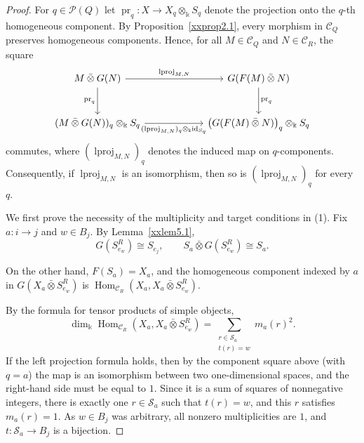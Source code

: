 \documentclass{amsart}
\newcommand{\id}{\mathrm{id}}
\DeclareMathOperator{\lproj}{lproj}
\newcommand{\btensor}{\mathbin{\bar{\otimes}}}
\theoremstyle{definition}
\theoremstyle{remark}
\numberwithin{equation}{section}
\begin{document}
\begin{proof}
For $q\in\mathcal P(Q)$ let
$\operatorname{pr}_q\colon X\to X_q\otimes_{\Bbbk}S_q$ denote the projection
onto the $q$-th homogeneous component. By
Proposition~\ref{xxprop2.1}, every morphism in
$\mathcal C_Q$ preserves homogeneous components. Hence, for all
$M\in\mathcal C_Q$ and $N\in\mathcal C_R$, the square
\[
\begin{tikzcd}[column sep=6em,row sep=large]
M\btensor G(N)
  \arrow[r,"\lproj_{M,N}"]
  \arrow[d,"\operatorname{pr}_q"']
&
G(F(M)\btensor N)
  \arrow[d,"\operatorname{pr}_q"]\\
(M\btensor G(N))_q\otimes_{\Bbbk}S_q
  \arrow[r,"(\lproj_{M,N})_q\otimes_{\Bbbk}\id_{S_q}"']
&
\bigl(G(F(M)\btensor N)\bigr)_q\otimes_{\Bbbk}S_q
\end{tikzcd}
\]
commutes, where $(\lproj_{M,N})_q$ denotes the induced map on
$q$-components. Consequently, if $\lproj_{M,N}$ is an isomorphism, then so
is $(\lproj_{M,N})_q$ for every $q$.

We first prove the necessity of the multiplicity and target
conditions in \textup{(1)}.
Fix
$a\colon i\to j$
and
$w\in B_j$.
By
Lemma~\ref{xxlem5.1},
\[
G(S_{e_w}^R)\cong S_{e_j},
\qquad
S_a\btensor G(S_{e_w}^R)\cong S_a.
\]

On the other hand, $F(S_a)=X_a$, and the homogeneous component indexed by
$a$ in $G(X_a\btensor S_{e_w}^R)$ is
${\operatorname{Hom}_{\mathcal C_R}(X_a,X_a\btensor S_{e_w}^R)}$.

By the formula for tensor products of simple objects,
\[
\dim_{\Bbbk}
\operatorname{Hom}_{\mathcal C_R}(X_a,X_a\btensor S_{e_w}^R)
=
\sum_{\substack{r\in\mathcal S_a\\t(r)=w}}
m_a(r)^2.
\]
If the left projection formula holds, then by the component square above
(with $q=a$) the map is an isomorphism between two one-dimensional spaces,
and the right-hand side must be equal to $1$.
Since it is a sum of squares of nonnegative integers, there is exactly one
$r\in\mathcal S_a$
such that $t(r)=w$, and this $r$ satisfies $m_a(r)=1$.
As $w\in B_j$ was arbitrary, all nonzero multiplicities are $1$, and
$t\colon\mathcal S_a\to B_j$ is a bijection.


\end{proof}
\end{document}
